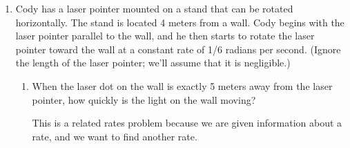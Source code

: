 \documentclass[main]{subfiles}
\begin{document}
\begin{enumerate}
\item 
  Cody has a laser pointer mounted on a
  stand that can be rotated horizontally.  The stand is located 4 meters
  from a wall.  Cody begins with the laser pointer parallel to the wall,
  and he then starts to rotate the laser pointer toward the wall at a
  constant rate of 1/6 radians per second.  (Ignore the length of the
  laser pointer; we'll assume that it is negligible.)

  \begin{enumerate}
  \item
    \begin{problem}[\vfill\vfill]
      When the laser dot on the wall is exactly 5 meters away from the
      laser pointer, how quickly is the light on the wall moving?
    \end{problem}

    \begin{solution}
      This is a related rates problem because we are given information
      about a rate, and we want to find another rate.



\end{solution}
\end{enumerate}
\end{enumerate}
\end{document}
